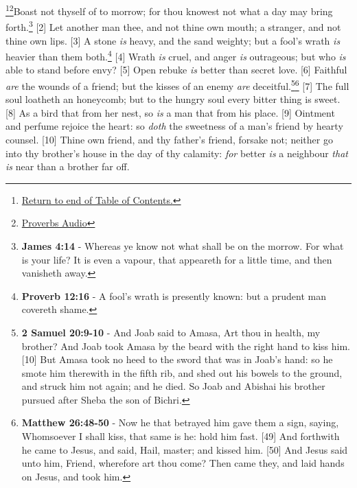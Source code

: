 \footnote{\textcolor[cmyk]{0.99998,1,0,0}{\hyperlink{TOC}{Return to end of Table of Contents.}}}\footnote{\href{https://www.audioverse.org/english/audiobibles/books/ENGKJV/O/Prov/1}{\textcolor[cmyk]{0.99998,1,0,0}{Proverbs Audio}}}\textcolor[cmyk]{0.99998,1,0,0}{Boast not thyself of to morrow; for thou knowest not what a day may bring forth.}\footnote{\textbf{James 4:14} -  Whereas ye know not what shall be on the morrow. For what is your life? It is even a vapour, that appeareth for a little time, and then vanisheth away.}
[2] \textcolor[cmyk]{0.99998,1,0,0}{Let another man  thee, and not thine own mouth; a stranger, and not thine own lips.}
[3] \textcolor[cmyk]{0.99998,1,0,0}{A stone \emph{is} heavy, and the sand weighty; but a fool's wrath \emph{is} heavier than them both.}\footnote{\textbf{Proverb 12:16} - A fool’s wrath is presently known: but a prudent man covereth shame.}
[4] \textcolor[cmyk]{0.99998,1,0,0}{Wrath \emph{is} cruel, and anger \emph{is} outrageous; but who \emph{is} able to stand before envy?}
[5] \textcolor[cmyk]{0.99998,1,0,0}{Open rebuke \emph{is} better than secret love.}
[6] \textcolor[cmyk]{0.99998,1,0,0}{Faithful \emph{are} the wounds of a friend; but the kisses of an enemy \emph{are} deceitful.}\footnote{\textbf{2 Samuel 20:9-10} - And Joab said to Amasa, Art thou in health, my brother? And Joab took Amasa by the beard with the right hand to kiss him. [10] But Amasa took no heed to the sword that was in Joab’s hand: so he smote him therewith in the fifth rib, and shed out his bowels to the ground, and struck him not again; and he died. So Joab and Abishai his brother pursued after Sheba the son of Bichri.}\footnote{\textbf{Matthew 26:48-50} - Now he that betrayed him gave them a sign, saying, Whomsoever I shall kiss, that same is he: hold him fast. [49] And forthwith he came to Jesus, and said, Hail, master; and kissed him. [50] And Jesus said unto him, \textcolor{myRed}{Friend, wherefore art thou come?} Then came they, and laid hands on Jesus, and took him.}
[7] \textcolor[cmyk]{0.99998,1,0,0}{The full soul loatheth an honeycomb; but to the hungry soul every bitter thing is sweet.}
[8] \textcolor[cmyk]{0.99998,1,0,0}{As a bird that  from her nest, so \emph{is} a man that  from his place.}
[9] \textcolor[cmyk]{0.99998,1,0,0}{Ointment and perfume rejoice the heart: so \emph{doth} the sweetness of a man's friend by hearty counsel.}
[10] \textcolor[cmyk]{0.99998,1,0,0}{Thine own friend, and thy father's friend, forsake not; neither go into thy brother's house in the day of thy calamity: \emph{for} better \emph{is} a neighbour \emph{that} \emph{is} near than a brother far off.}
